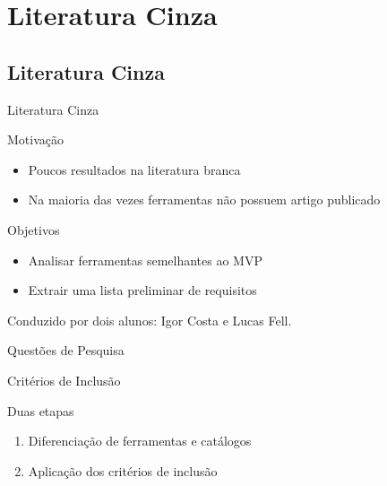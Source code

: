 
\section{Literatura Cinza}
\subsection*{Literatura Cinza}


\begin{frame}{{\sffamily Literatura Cinza}}
\begin{block}{Motivação}
    \begin{itemize}
        \item Poucos resultados na literatura branca
        \item Na maioria das vezes ferramentas não possuem artigo publicado
    \end{itemize}
\end{block}

\begin{block}{Objetivos}
    \begin{itemize}
        \item Analisar ferramentas semelhantes ao MVP
        \item Extrair uma lista preliminar de requisitos
    \end{itemize}
\end{block}
Conduzido por dois alunos: Igor Costa e Lucas Fell.
\end{frame}

\begin{frame}{{\sffamily Questões de Pesquisa}}
    
\end{frame}

\begin{frame}{{\sffamily Critérios de Inclusão}}
\begin{block}{Duas etapas}
    \begin{enumerate}
        \item Diferenciação de ferramentas e catálogos
        \item Aplicação dos critérios de inclusão
    \end{enumerate}
\end{block}
        
\end{frame}

